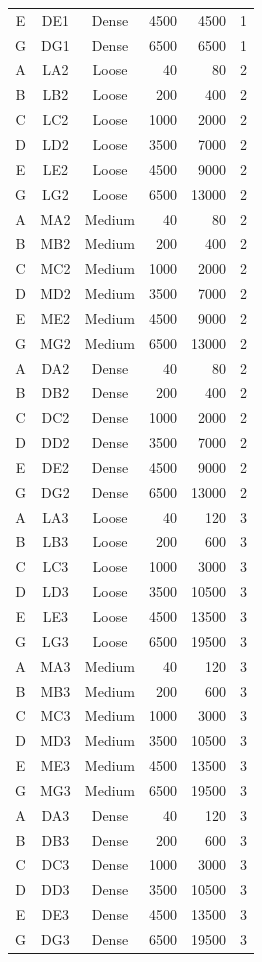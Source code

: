 \documentclass[a4paper, nobind]{templates/ociamthesis}
\begin{document}
\begin{longtable}[c]{cccrrr}
E & DE1 & Dense  & 4500 & 4500  & 1 \\
G & DG1 & Dense  & 6500 & 6500  & 1 \\
A & LA2 & Loose  & 40   & 80    & 2 \\
B & LB2 & Loose  & 200  & 400   & 2 \\
C & LC2 & Loose  & 1000 & 2000  & 2 \\
D & LD2 & Loose  & 3500 & 7000  & 2 \\
E & LE2 & Loose  & 4500 & 9000  & 2 \\
G & LG2 & Loose  & 6500 & 13000 & 2 \\
A & MA2 & Medium & 40   & 80    & 2 \\
B & MB2 & Medium & 200  & 400   & 2 \\
C & MC2 & Medium & 1000 & 2000  & 2 \\
D & MD2 & Medium & 3500 & 7000  & 2 \\
E & ME2 & Medium & 4500 & 9000  & 2 \\
G & MG2 & Medium & 6500 & 13000 & 2 \\
A & DA2 & Dense  & 40   & 80    & 2 \\
B & DB2 & Dense  & 200  & 400   & 2 \\
C & DC2 & Dense  & 1000 & 2000  & 2 \\
D & DD2 & Dense  & 3500 & 7000  & 2 \\
E & DE2 & Dense  & 4500 & 9000  & 2 \\
G & DG2 & Dense  & 6500 & 13000 & 2 \\
A & LA3 & Loose  & 40   & 120   & 3 \\
B & LB3 & Loose  & 200  & 600   & 3 \\
C & LC3 & Loose  & 1000 & 3000  & 3 \\
D & LD3 & Loose  & 3500 & 10500 & 3 \\
E & LE3 & Loose  & 4500 & 13500 & 3 \\
G & LG3 & Loose  & 6500 & 19500 & 3 \\
A & MA3 & Medium & 40   & 120   & 3 \\
B & MB3 & Medium & 200  & 600   & 3 \\
C & MC3 & Medium & 1000 & 3000  & 3 \\
D & MD3 & Medium & 3500 & 10500 & 3 \\
E & ME3 & Medium & 4500 & 13500 & 3 \\
G & MG3 & Medium & 6500 & 19500 & 3 \\
A & DA3 & Dense  & 40   & 120   & 3 \\
B & DB3 & Dense  & 200  & 600   & 3 \\
C & DC3 & Dense  & 1000 & 3000  & 3 \\
D & DD3 & Dense  & 3500 & 10500 & 3 \\
E & DE3 & Dense  & 4500 & 13500 & 3 \\
G & DG3 & Dense  & 6500 & 19500 & 3
\end{longtable}
\end{document}
